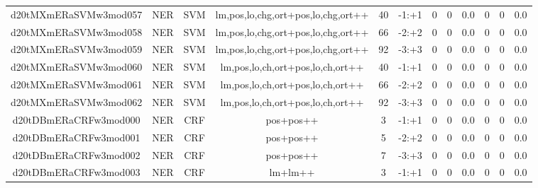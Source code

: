 \documentclass[a4paper]{article}
\begin{document}
\begin{landscape}
\begin{center}
\begin{tabular}{ |c|c|c|c|c|c|c|c|c|c|c|c|}
 	\small{ d20tMXmERaSVMw3mod057 } & \small{ NER} & \small{  SVM }  & lm,pos,lo,chg,ort+pos,lo,chg,ort++  &  40 &  \small{  -1:+1 }  &  0 & 0 & 0.0  &  0 & 0 & 0.0 \\
 	

 
 	
 	\small{ d20tMXmERaSVMw3mod058 } & \small{ NER} & \small{  SVM }  & lm,pos,lo,chg,ort+pos,lo,chg,ort++  &  66 &  \small{  -2:+2 }  &  0 & 0 & 0.0  &  0 & 0 & 0.0 \\
 	

 
 	
 	\small{ d20tMXmERaSVMw3mod059 } & \small{ NER} & \small{  SVM }  & lm,pos,lo,chg,ort+pos,lo,chg,ort++  &  92 &  \small{  -3:+3 }  &  0 & 0 & 0.0  &  0 & 0 & 0.0 \\
 	

 
 	
 	\small{ d20tMXmERaSVMw3mod060 } & \small{ NER} & \small{  SVM }  & lm,pos,lo,ch,ort+pos,lo,ch,ort++  &  40 &  \small{  -1:+1 }  &  0 & 0 & 0.0  &  0 & 0 & 0.0 \\
 	

 
 	
 	\small{ d20tMXmERaSVMw3mod061 } & \small{ NER} & \small{  SVM }  & lm,pos,lo,ch,ort+pos,lo,ch,ort++  &  66 &  \small{  -2:+2 }  &  0 & 0 & 0.0  &  0 & 0 & 0.0 \\
 	

 
 	
 	\small{ d20tMXmERaSVMw3mod062 } & \small{ NER} & \small{  SVM }  & lm,pos,lo,ch,ort+pos,lo,ch,ort++  &  92 &  \small{  -3:+3 }  &  0 & 0 & 0.0  &  0 & 0 & 0.0 \\
 	

 
 	
 	\small{ d20tDBmERaCRFw3mod000 } & \small{ NER} & \small{  CRF }  & pos+pos++  &  3 &  \small{  -1:+1 }  &  0 & 0 & 0.0  &  0 & 0 & 0.0 \\
 	

 
 	
 	\small{ d20tDBmERaCRFw3mod001 } & \small{ NER} & \small{  CRF }  & pos+pos++  &  5 &  \small{  -2:+2 }  &  0 & 0 & 0.0  &  0 & 0 & 0.0 \\
 	

 
 	
 	\small{ d20tDBmERaCRFw3mod002 } & \small{ NER} & \small{  CRF }  & pos+pos++  &  7 &  \small{  -3:+3 }  &  0 & 0 & 0.0  &  0 & 0 & 0.0 \\
 	

 
 	
 	\small{ d20tDBmERaCRFw3mod003 } & \small{ NER} & \small{  CRF }  & lm+lm++  &  3 &  \small{  -1:+1 }  &  0 & 0 & 0.0  &  0 & 0 & 0.0 \\
 	


\end{tabular}
\end{center}
\end{landscape}
\end{document}
